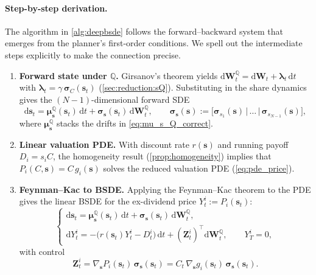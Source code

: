 \documentclass[11pt,letterpaper,oneside]{article}
\numberwithin{equation}{section}
\newcommand{\1}{\mathbf{1}}
\newcommand{\diff}{\mathrm{d}}
\begin{document}
\paragraph{Step-by-step derivation.}
The algorithm in \cref{alg:deepbsde} follows the forward--backward system that emerges from the planner's first-order conditions. We spell out the intermediate steps explicitly to make the connection precise.
\begin{enumerate}[label=\textbf{Step \arabic*.},wide=0pt,leftmargin=*]
  \item \textbf{Forward state under $\mathbb{Q}$.} Girsanov's theorem yields $\diff\bm{W}_t^{\mathbb{Q}} = \diff\bm{W}_t + \bm{\lambda}_t\,\diff t$ with $\bm{\lambda}_t=\gamma\,\bm{\sigma}_C(\bm{s}_t)$ (\cref{sec:reduction:sQ}). Substituting in the share dynamics gives the $(N-1)$-dimensional forward SDE
  \[
    \diff \bm{s}_t = \bm{\mu}_{\bm{s}}^{\mathbb{Q}}(\bm{s}_t)\,\diff t + \bm{\sigma}_{\bm{s}}(\bm{s}_t)\,\diff\bm{W}_t^{\mathbb{Q}}, \qquad \bm{\sigma}_{\bm{s}}(\bm{s}) := \big[\bm{\sigma}_{s_1}(\bm{s})\,|\,\dots\,|\,\bm{\sigma}_{s_{N-1}}(\bm{s})\big],
  \]
  where $\bm{\mu}_{\bm{s}}^{\mathbb{Q}}$ stacks the drifts in \cref{eq:mu_s_Q_correct}.

  \item \textbf{Linear valuation PDE.} With discount rate $r(\bm{s})$ and running payoff $D_i = s_i C$, the homogeneity result (\cref{prop:homogeneity}) implies that $P_i(C,\bm{s})=C\,g_i(\bm{s})$ solves the reduced valuation PDE (\cref{eq:pde_price}).

  \item \textbf{Feynman--Kac to BSDE.} Applying the Feynman--Kac theorem to the PDE gives the linear BSDE for the ex-dividend price $Y_t^{i}:=P_i(\bm{s}_t)$:
  \begin{equation}\label{eq:fbsde_price}
    \begin{cases}
      \diff \bm{s}_t = \bm{\mu}_{\bm{s}}^{\mathbb{Q}}(\bm{s}_t)\,\diff t + \bm{\sigma}_{\bm{s}}(\bm{s}_t)\,\diff\bm{W}_t^{\mathbb{Q}},\\[0.25em]
      \diff Y_t^{i} = -\big(r(\bm{s}_t) Y_t^{i} - D_t^{i}\big)\,\diff t + (\bm{Z}_t^{i})^{\top}\diff\bm{W}_t^{\mathbb{Q}}, \qquad Y_T^{i}=0,
    \end{cases}
  \end{equation}
  with control
  \begin{equation}\label{eq:control_price}
    \bm{Z}_t^{i} = \nabla_{\bm{s}} P_i(\bm{s}_t)\,\bm{\sigma}_{\bm{s}}(\bm{s}_t) = C_t \,\nabla_{\bm{s}} g_i(\bm{s}_t)\,\bm{\sigma}_{\bm{s}}(\bm{s}_t).
  \end{equation}


\end{enumerate}
\end{document}
